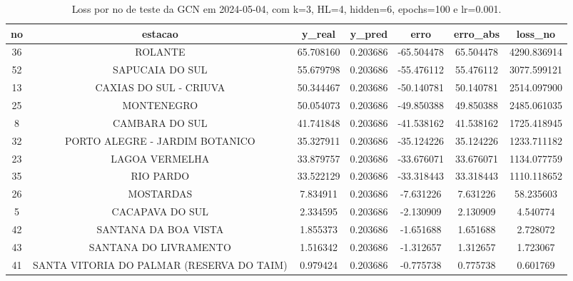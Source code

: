 \begin{table}[h]
\centering
\caption{Loss por no de teste da GCN em 2024-05-04, com k=3, HL=4, hidden=6, epochs=100 e lr=0.001.}
\label{tab:gcn_loss_k3_hl4_h6_e100_d20240504}
\begin{tabular}{ccccccc}
\toprule
no & estacao & y\_real & y\_pred & erro & erro\_abs & loss\_no \\
\midrule
36 & ROLANTE & 65.708160 & 0.203686 & -65.504478 & 65.504478 & 4290.836914 \\
52 & SAPUCAIA DO SUL & 55.679798 & 0.203686 & -55.476112 & 55.476112 & 3077.599121 \\
13 & CAXIAS DO SUL - CRIUVA & 50.344467 & 0.203686 & -50.140781 & 50.140781 & 2514.097900 \\
25 & MONTENEGRO & 50.054073 & 0.203686 & -49.850388 & 49.850388 & 2485.061035 \\
8 & CAMBARA DO SUL & 41.741848 & 0.203686 & -41.538162 & 41.538162 & 1725.418945 \\
32 & PORTO ALEGRE - JARDIM BOTANICO & 35.327911 & 0.203686 & -35.124226 & 35.124226 & 1233.711182 \\
23 & LAGOA VERMELHA & 33.879757 & 0.203686 & -33.676071 & 33.676071 & 1134.077759 \\
35 & RIO PARDO & 33.522129 & 0.203686 & -33.318443 & 33.318443 & 1110.118652 \\
26 & MOSTARDAS & 7.834911 & 0.203686 & -7.631226 & 7.631226 & 58.235603 \\
5 & CACAPAVA DO SUL & 2.334595 & 0.203686 & -2.130909 & 2.130909 & 4.540774 \\
42 & SANTANA DA BOA VISTA & 1.855373 & 0.203686 & -1.651688 & 1.651688 & 2.728072 \\
43 & SANTANA DO LIVRAMENTO & 1.516342 & 0.203686 & -1.312657 & 1.312657 & 1.723067 \\
41 & SANTA VITORIA DO PALMAR (RESERVA DO TAIM) & 0.979424 & 0.203686 & -0.775738 & 0.775738 & 0.601769 \\
\bottomrule
\end{tabular}
\end{table}
